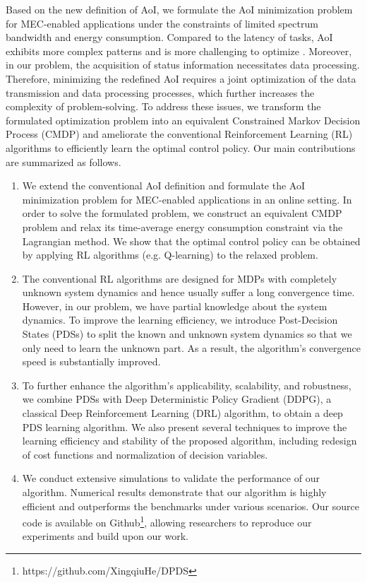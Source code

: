 \documentclass[lettersize, journal]{IEEEtran}
\begin{document}
Based on the new definition of AoI, we formulate the AoI minimization problem for MEC-enabled applications under the constraints of limited spectrum bandwidth and energy consumption. 
Compared to the latency of tasks, AoI exhibits more complex patterns and is more challenging to optimize \cite{kaul2012real}. 
Moreover, in our problem, the acquisition of status information necessitates data processing.
Therefore, minimizing the redefined AoI requires a joint optimization of the data transmission and data processing processes, 
which further increases the complexity of problem-solving.
To address these issues, we transform the formulated optimization problem into an equivalent Constrained Markov Decision Process (CMDP)
and ameliorate the conventional Reinforcement Learning (RL) algorithms to efficiently learn the optimal control policy.
Our main contributions are summarized as follows.
\begin{enumerate}
    \item We extend the conventional AoI definition and formulate the AoI minimization problem 
        for MEC-enabled applications in an online setting.
        In order to solve the formulated problem, we construct an equivalent CMDP problem and relax its time-average energy consumption constraint via the Lagrangian method.
        We show that the optimal control policy can be obtained by applying RL algorithms (e.g. Q-learning) to the relaxed problem.
    \item The conventional RL algorithms are designed for MDPs with completely unknown system dynamics and hence usually suffer a long convergence time.
        However, in our problem, we have partial knowledge about the system dynamics.
        To improve the learning efficiency, we introduce Post-Decision States (PDSs) to split the known and unknown system dynamics
        so that we only need to learn the unknown part.
        As a result, the algorithm's convergence speed is substantially improved.
    \item To further enhance the algorithm's applicability, scalability, and robustness, we combine PDSs with 
      Deep Deterministic Policy Gradient (DDPG), a classical Deep Reinforcement Learning (DRL) algorithm,
      to obtain a deep PDS learning algorithm.
      We also present several techniques to improve the learning efficiency and stability of the proposed algorithm, including
      redesign of cost functions and normalization of decision variables.
    \item We conduct extensive simulations to validate the performance of our algorithm.
        Numerical results demonstrate that our algorithm is highly efficient and outperforms the benchmarks under various scenarios.
        Our source code is available on Github\footnote{https://github.com/XingqiuHe/DPDS}, allowing researchers to reproduce our experiments and build upon our work.
\end{enumerate}
\end{document}
